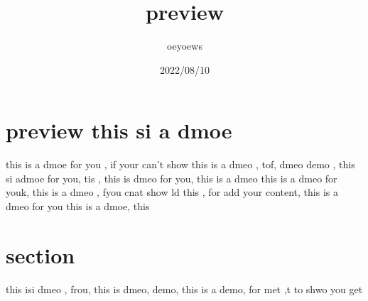 \documentclass{article}
\title{preview}
\author{oeyoews}
\date{2022/08/10}
\begin{document}
\maketitle


\section{preview this si a dmoe}%
\label{sec:preview this si a dmoe}

this is a dmoe for you , if your can't show this is a dmeo , tof, dmeo demo , this si admoe for you, tis ,
this is dmeo for you, this is a dmeo
this is a dmeo for youk, this is a dmeo , fyou cnat show ld this , for
 add your content, this is a dmeo for you
 this is a dmoe, this

 \newpage

 \section{section}%
 \label{sec:section}

 this isi dmeo , frou, this is dmeo, demo, this is a demo, for met ,t to shwo you get
\end{document}
